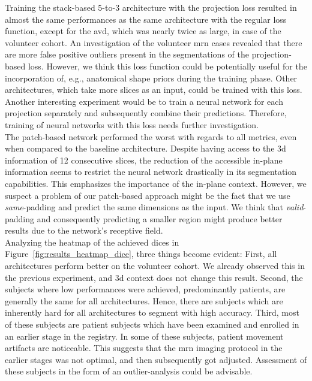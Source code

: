 Training the stack-based 5-to-3 architecture with the projection loss resulted in almost the same performances as the same architecture with the regular loss function, except for the \acrlong{avd}, which was nearly twice as large, in case of the volunteer cohort. An investigation of the volunteer \gls{mrn} cases revealed that there are more false positive outliers present in the segmentations of the projection-based loss. However, we think this loss function could be potentially useful for the incorporation of, e.g., anatomical shape priors during the training phase. Other architectures, which take more slices as an input, could be trained with this loss. Another interesting experiment would be to train a neural network for each projection separately and subsequently combine their predictions. Therefore, training of neural networks with this loss needs further investigation.\\
The patch-based network performed the worst with regards to all metrics, even when compared to the baseline architecture. Despite having access to the \gls{3d} information of 12 consecutive slices, the reduction of the accessible in-plane information seems to restrict the neural network drastically in its segmentation capabilities. This emphasizes the importance of the in-plane context. However, we suspect a problem of our patch-based approach might be the fact that we use \textit{same}-padding and predict the same dimensions as the input. We think that \textit{valid}-padding and consequently predicting a smaller region might produce better results due to the network's receptive field.\\
Analyzing the heatmap of the achieved \gls{dice}s in Figure~\ref{fig:results_heatmap_dice}, three things become evident: First, all architectures perform better on the volunteer cohort. We already observed this in the previous experiment, and \gls{3d} context does not change this result. Second, the subjects where low performances were achieved, predominantly patients, are generally the same for all architectures. Hence, there are subjects which are inherently hard for all architectures to segment with high accuracy. Third, most of these subjects are patient subjects which have been examined and enrolled in an earlier stage in the registry. In some of these subjects, patient movement artifacts are noticeable. This suggests that the \gls{mrn} imaging protocol in the earlier stages was not optimal, and then subsequently got adjusted. Assessment of these subjects in the form of an outlier-analysis could be advisable.\\
